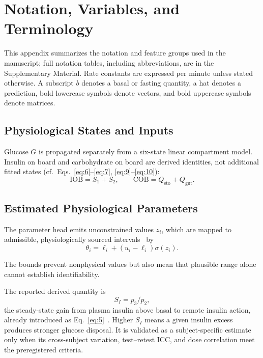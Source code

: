\documentclass[journal]{IEEEtran}
\begin{document}
\section{Notation, Variables, and Terminology}

This appendix summarizes the notation and feature groups used in the manuscript; full notation tables, including abbreviations, are in the Supplementary Material. Rate constants are expressed per minute unless stated otherwise. A subscript $b$ denotes a basal or fasting quantity, a hat denotes a prediction, bold lowercase symbols denote vectors, and bold uppercase symbols denote matrices.

\subsection{Physiological States and Inputs}

Glucose $G$ is propagated separately from a six-state linear compartment model. Insulin on board and carbohydrate on board are derived identities, not additional fitted states (cf.\ Eqs.~\eqref{eq:6}--\eqref{eq:7}, \eqref{eq:9}--\eqref{eq:10}):
\begin{equation}
\text{IOB} = S_1 + S_2, \qquad \text{COB} = Q_{\text{sto}} + Q_{\text{gut}}.
\label{eq:19}
\end{equation}

\subsection{Estimated Physiological Parameters}

The parameter head emits unconstrained values $z_i$, which are mapped to admissible, physiologically sourced intervals~\cite{ref33} by
\begin{equation}
\theta_i = \ell_i + (u_i - \ell_i)\sigma(z_i).
\label{eq:20}
\end{equation}

The bounds prevent nonphysical values but also mean that plausible range alone cannot establish identifiability.

The reported derived quantity is
\begin{equation}
S_I = p_3/p_2,
\label{eq:21}
\end{equation}
the steady-state gain from plasma insulin above basal to remote insulin action, already introduced as Eq.~\eqref{eq:5}~\cite{ref1,ref32}. Higher $S_I$ means a given insulin excess produces stronger glucose disposal. It is validated as a subject-specific estimate only when its cross-subject variation, test--retest ICC, and dose correlation meet the preregistered criteria.
\end{document}
